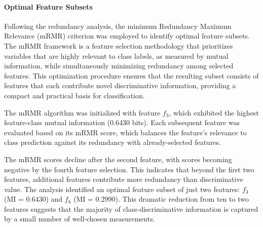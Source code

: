\documentclass{erauthesis}
\begin{document}
\paragraph{Optimal Feature Subsets}
Following the redundancy analysis, the minimum Redundancy Maximum Relevance (mRMR) criterion was employed to identify optimal feature subsets. 
The mRMR framework is a feature selection methodology that prioritizes variables that are highly relevant to class labels, as measured by mutual information, while simultaneously minimizing redundancy among selected features. 
This optimization procedure ensures that the resulting subset consists of features that each contribute novel discriminative information, providing a compact and practical basis for classification.

The mRMR algorithm was initialized with feature $f_3$, which exhibited the highest feature-class mutual information (0.6430 bits). 
Each subsequent feature was evaluated based on its mRMR score, which balances the feature's relevance to class prediction against its redundancy with already-selected features. 

The mRMR scores decline after the second feature, with scores becoming negative by the fourth feature selection. This indicates that beyond the first two features, additional features contribute more redundancy than discriminative value. 
The analysis identified an optimal feature subset of just two features: $f_3$ (MI = 0.6430) and $f_8$ (MI = 0.2990). This dramatic reduction from ten to two features suggests that the majority of class-discriminative information is captured by a small number of well-chosen measurements.
\end{document}
